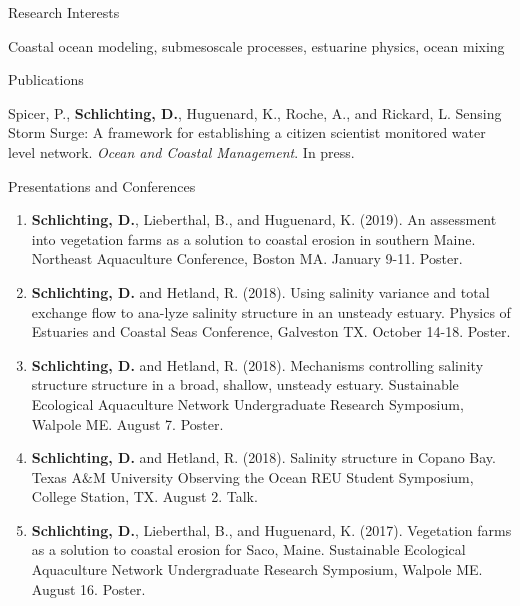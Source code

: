 \documentclass{resume} %
\begin{document}
\begin{rSection}{Research Interests}
\vspace{-10pt}
\item Coastal ocean modeling, submesoscale processes, estuarine physics, ocean mixing

\end{rSection}

\begin{rSection}{Publications}
\vspace{-10pt}
\item Spicer, P., \textbf{Schlichting, D.}, Huguenard, K., Roche, A., and Rickard, L. Sensing Storm Surge: A framework for establishing a citizen scientist monitored water level network. \textit{Ocean and Coastal Management}. In press.
\end{rSection}

\begin{rSection}{Presentations and Conferences} \itemsep -3pt  
\begin{enumerate}
    \item \textbf{Schlichting, D.}, Lieberthal, B., and Huguenard, K. (2019). An assessment into vegetation farms as a solution to coastal erosion in southern Maine. Northeast Aquaculture Conference, Boston MA. January 9-11. Poster.
    \item \textbf{Schlichting, D.} and Hetland, R. (2018). Using salinity variance and total exchange flow to ana-lyze salinity structure in an unsteady estuary. Physics of Estuaries and Coastal Seas Conference, Galveston TX. October 14-18. Poster.
    \item \textbf{Schlichting, D.} and Hetland, R. (2018). Mechanisms controlling salinity structure structure in a broad, shallow, unsteady estuary. Sustainable Ecological Aquaculture Network Undergraduate Research Symposium, Walpole ME. August 7. Poster.
    \item \textbf{Schlichting, D.} and Hetland, R. (2018). Salinity structure in Copano Bay. Texas A$\&$M University Observing the Ocean REU Student Symposium, College Station, TX. August 2. Talk.
    \item \textbf{Schlichting, D.}, Lieberthal, B., and Huguenard, K. (2017). Vegetation farms as a solution to coastal erosion for Saco, Maine. Sustainable Ecological Aquaculture Network Undergraduate Research Symposium, Walpole ME. August 16. Poster.
\end{enumerate}
\end{rSection}
\end{document}
